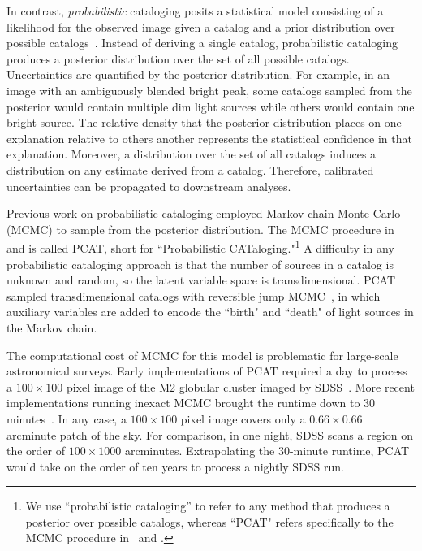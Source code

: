 In contrast, {\itshape probabilistic} cataloging posits a statistical model consisting of a likelihood for the observed image given a catalog and a prior distribution over possible catalogs~\citep{Portillo_2017, Brewer_2013, Feder_2019}.
Instead of deriving a single catalog, probabilistic cataloging produces a posterior distribution over the set of all possible catalogs.
Uncertainties are quantified by the posterior distribution.
For example, in an image with an ambiguously blended bright peak, some catalogs sampled from the posterior would contain multiple dim light sources while others would contain one bright source.
The relative density that the posterior distribution places on one explanation
relative to others another represents the statistical confidence in that explanation.
Moreover, a distribution over the set of all catalogs induces a distribution on any estimate derived from a catalog. Therefore, calibrated uncertainties can be propagated to downstream analyses.

Previous work on probabilistic cataloging employed Markov chain Monte Carlo (MCMC) to sample from the posterior distribution.
The MCMC procedure in~\cite{Portillo_2017} and \cite{Feder_2019}
is called PCAT, short for ``Probabilistic CATaloging."\footnote{
We use ``probabilistic cataloging'' to refer to any method that produces a posterior over possible catalogs, whereas ``PCAT" refers specifically to the MCMC procedure in~\cite{Portillo_2017} and \cite{Feder_2019}. }
A difficulty in any probabilistic cataloging approach is that the number of sources in a catalog is unknown and random, so the latent variable space is transdimensional. PCAT sampled transdimensional catalogs with reversible jump MCMC~\citep{Green95reversiblejump}, in which
auxiliary variables are added to encode the ``birth" and ``death" of light sources in the Markov chain.

The computational cost of MCMC for this model is problematic for large-scale astronomical surveys.
Early implementations of PCAT required a day to process a $100\times 100$ pixel image of the M2 globular cluster imaged by SDSS~\citep{Portillo_2017}.
More recent implementations running inexact MCMC brought the runtime down to 30  minutes~\citep{Feder_2019}.
In any case, a $100\times 100$ pixel image covers only a $0.66 \times 0.66$ arcminute patch of the sky.
For comparison, in one night, SDSS scans a region on the order of $100 \times 1000$ arcminutes.
Extrapolating the 30-minute runtime, PCAT would take on the order of ten years to process a nightly SDSS run.


